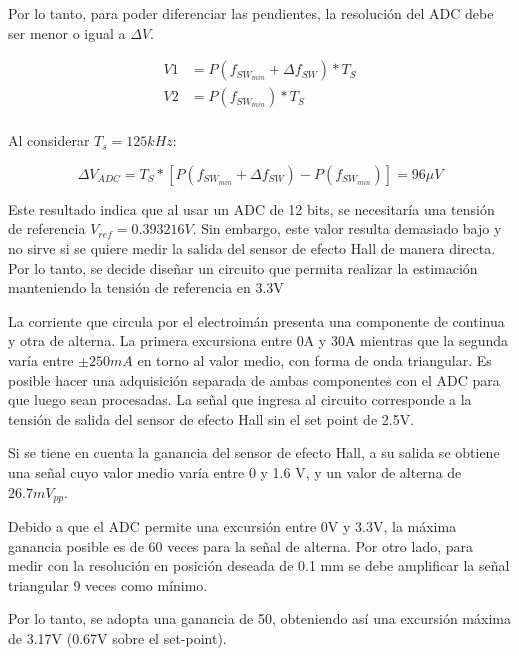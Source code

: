 \noindent Por lo tanto, para poder diferenciar las pendientes, la resolución del ADC debe ser menor o igual a $\Delta V$.

\begin{equation} 
	\begin{aligned}
		V1 &= P(f_{SW_{min}} + \Delta f_{SW})* T_S \\
		V2 &= P(f_{SW_{min}})* T_S \\		 
	\end{aligned}
\end{equation}

\noindent Al considerar $T_s = 125 kHz$:

\begin{equation} 
	\Delta V_{ADC} = T_S * [P(f_{SW_{min}} + \Delta f_{SW}) - P(f_{SW_{min}})] = 96 \mu V
\end{equation}



\noindent Este resultado indica que al usar un ADC de 12 bits, se necesitaría una tensión de referencia $V_{ref} = 0.393216 V$. Sin embargo, este valor resulta demasiado bajo y no sirve si se quiere medir la salida del sensor de efecto Hall de manera directa. Por lo tanto, se decide diseñar un circuito que permita realizar la estimación manteniendo la tensión de referencia en 3.3V

\noindent La corriente que circula por el electroimán presenta una componente de continua y otra de alterna. La primera excursiona entre 0A y 30A mientras que la segunda varía entre $\pm 250 mA$ en torno al valor medio, con forma de onda triangular. Es posible hacer una adquisición separada de ambas componentes con el ADC para que luego sean procesadas. La señal que ingresa al circuito corresponde a la tensión de salida del sensor de efecto Hall sin el set point de 2.5V.

\noindent Si se tiene en cuenta la ganancia del sensor de efecto Hall, a su salida se obtiene una señal cuyo valor medio varía entre 0 y 1.6 V, y un valor de alterna de $26.7 mV_{pp}$.

\noindent Debido a que el ADC permite una excursión entre 0V y 3.3V, la máxima ganancia posible es de 60 veces para la señal de alterna. Por otro lado, para medir con la resolución en posición deseada de 0.1 mm se debe amplificar la señal triangular 9 veces como mínimo.

\noindent Por lo tanto, se adopta una ganancia de 50, obteniendo así una excursión máxima de 3.17V (0.67V sobre el set-point).

